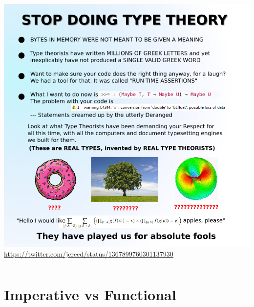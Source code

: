 \documentclass{beamer}
\begin{document}
\begin{frame}[fragile]
\begin{columns}[c]
        \centering
        \includegraphics[width=\textwidth]{stop-doing-type-theory.png}
        \tiny\color{gray}\url{https://twitter.com/jcreed/status/1367899760301137930}
    \end{columns}
  \end{frame}


\section{Imperative vs Functional}
\end{document}
